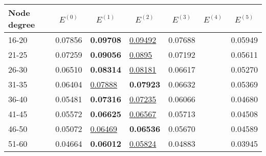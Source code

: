 \begin{table*}[]
    \centering
    \begin{tabular}{|l|l|l|l|l|l|l|}
        \hline
        Node degree & \multicolumn{1}{c|}{$E^{(0)}$} & \multicolumn{1}{c|}{$E^{(1)}$} & \multicolumn{1}{c|}{$E^{(2)}$} & \multicolumn{1}{c|}{$E^{(3)}$} & \multicolumn{1}{c|}{$E^{(4)}$} & \multicolumn{1}{c|}{$E^{(5)}$} \\ \hline
        16-20       & 0.07856                        & \textbf{0.09708}               & \underline{0.09492}            & 0.07688                        &                                & 0.05949                        \\ \hline
        21-25       & 0.07259                        & \textbf{0.09056}               & \underline{0.0895}             & 0.07192                        &                                & 0.05611                        \\ \hline
        26-30       & 0.06510                        & \textbf{0.08314}               & \underline{0.08181}            & 0.06617                        &                                & 0.05270                        \\ \hline
        31-35       & 0.06404                        & \underline{0.07888}            & \textbf{0.07923}               & 0.06632                        &                                & 0.05369                        \\ \hline
        36-40       & 0.05481                        & \textbf{0.07316}               & \underline{0.07235}            & 0.06066                        &                                & 0.04680                        \\ \hline
        41-45       & 0.05572                        & \textbf{0.06625}               & \underline{0.06567}            & 0.05713                        &                                & 0.04508                        \\ \hline
        46-50       & 0.05072                        & \underline{0.06469}            & \textbf{0.06536}               & 0.05670                        &                                & 0.04589                        \\ \hline
        51-60       & 0.04664                        & \textbf{0.06012}               & \underline{0.05824}            & 0.04883                        &                                & 0.03945                        \\ \hline

\end{tabular}
\end{table*}
